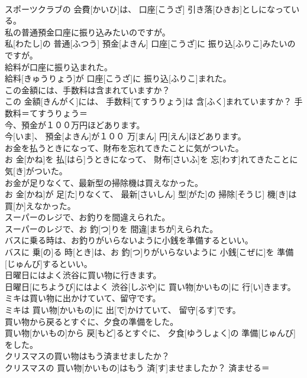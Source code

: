 \documentclass[8pt]{extreport}
\begin{document}
\begin{CJK}{UTF8}{min}
\\	スポーツクラブの 会費[かいひ]は、 口座[こうざ] 引き落[ひきお]としになっている。	
\\	私の普通預金口座に振り込みたいのですが。	
\\	私[わたし]の 普通[ふつう] 預金[よきん] 口座[こうざ]に 振り込[ふりこ]みたいのですが。	
\\	給料が口座に振り込まれた。	
\\	給料[きゅうりょう]が 口座[こうざ]に 振り込[ふりこ]まれた。	
\\	この金額には、手数料は含まれていますか？	
\\	この 金額[きんがく]には、 手数料[てすうりょう]は 含[ふく]まれていますか？	手数料＝てすうりょう＝ 
\\	今、預金が１００万円ほどあります。	
\\	今[いま]、 預金[よきん]が１００ 万[まん] 円[えん]ほどあります。	
\\	お金を払うときになって、財布を忘れてきたことに気がついた。	
\\	お 金[かね]を 払[はら]うときになって、 財布[さいふ]を 忘[わす]れてきたことに 気[き]がついた。	
\\	お金が足りなくて、最新型の掃除機は買えなかった。	
\\	お 金[かね]が 足[た]りなくて、 最新[さいしん] 型[がた]の 掃除[そうじ] 機[き]は 買[か]えなかった。	
\\	スーパーのレジで、お釣りを間違えられた。	
\\	スーパーのレジで、お 釣[つ]りを 間違[まちが]えられた。	
\\	バスに乗る時は、お釣りがいらないように小銭を準備するといい。	
\\	バスに 乗[の]る 時[とき]は、お 釣[つ]りがいらないように 小銭[こぜに]を 準備[じゅんび]するといい。	
\\	日曜日にはよく渋谷に買い物に行きます。	
\\	日曜日[にちようび]にはよく 渋谷[しぶや]に 買い物[かいもの]に 行[い]きます。	
\\	ミキは買い物に出かけていて、留守です。	
\\	ミキは 買い物[かいもの]に 出[で]かけていて、 留守[るす]です。	
\\	買い物から戻るとすぐに、夕食の準備をした。	
\\	買い物[かいもの]から 戻[もど]るとすぐに、 夕食[ゆうしょく]の 準備[じゅんび]をした。	
\\	クリスマスの買い物はもう済ませましたか？	
\\	クリスマスの 買い物[かいもの]はもう 済[す]ませましたか？	済ませる＝ 

\end{CJK}
\end{document}
